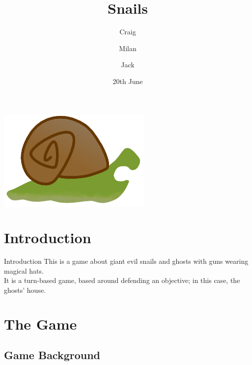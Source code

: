 \documentclass{beamer}
\title{Snails}
\author{Craig \and Milan \and Jack}
\date{20th June}
\begin{document}
\begin{frame}
  \titlepage
  \vspace{\baselineskip}
  \begin{center}
    \includegraphics[scale=0.15]{snail_teeth.png}
  \end{center}
\end{frame}

\section{Introduction}

\begin{frame}{Introduction}
  This is a game about giant evil snails and ghosts with guns wearing magical hats.\\
  \vspace{\baselineskip}
  It is a turn-based game, based around defending an objective; in this case, the ghosts' house.
\end{frame}


\section{The Game}
\subsection{Game Background}
\end{document}
